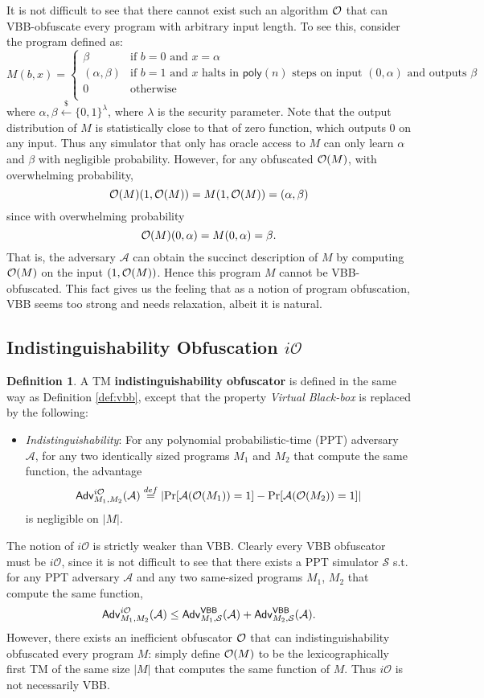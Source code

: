 \documentclass[12pt]{article}
\newcommand{\eqdef}{\stackrel{def}{=}}
\newcommand{\bits}{\{0,1\}}
\newcommand{\getsr}{\stackrel{\$}{\gets}}
\newcommand{\A}{\mathcal{A}}
\newcommand{\Sim}{\mathcal{S}}
\newcommand{\Adv}{\mathsf{Adv}}
\newcommand{\poly}{\mathsf{poly}}
\newcommand{\io}{i\mathcal{O}}
\theoremstyle{definition}
\newtheorem{definition}[theorem]{Definition}
\begin{document}
It is not difficult to see that there cannot exist such an algorithm $\mathcal{O}$ that can VBB-obfuscate every program with arbitrary input length. To see this, consider the program defined as:
$$M(b,x) = 
\begin{cases}
\beta & \textrm{if $b=0$ and $x=\alpha$} \\
(\alpha, \beta) & \textrm{if $b=1$ and $x$ halts in $\poly(n)$ steps on input $(0,\alpha)$ and outputs $\beta$} \\
0 & \textrm{otherwise} \\
\end{cases}$$
where $\alpha, \beta \getsr \bits^\lambda$, where $\lambda$ is the security parameter.
Note that the output distribution of $M$ is statistically close to that of zero function, which outputs 0 on any input. Thus any simulator that only has oracle access to $M$ can only learn $\alpha$ and $\beta$ with negligible probability. However, for any obfuscated $\mathcal{O}(M)$, with overwhelming probability,
$$\mathcal{O}(M)(1, \mathcal{O}(M)) = M(1, \mathcal{O}(M)) = (\alpha, \beta)$$
since with overwhelming probability
$$\mathcal{O}(M)(0,\alpha) = M(0,\alpha) = \beta.$$ 
That is, the adversary $\A$ can obtain the succinct description of $M$ by computing $\mathcal{O}(M)$ on the input $(1, \mathcal{O}(M))$. Hence this program $M$ cannot be VBB-obfuscated. This fact gives us the feeling that as a notion of program obfuscation, VBB seems too strong and needs relaxation, albeit it is natural.

\subsection{Indistinguishability Obfuscation $\io$}
\begin{definition}
A TM {\bf indistinguishability obfuscator} is defined in the same way as Definition \ref{def:vbb}, except that the property \emph{Virtual Black-box} is replaced by the following:
\begin{itemize}
\item \emph{Indistinguishability}: For any polynomial probabilistic-time (PPT) adversary $\A$, for any two identically sized programs $M_1$ and $M_2$ that compute the same function, the advantage 
$$\Adv_{M_1,M_2}^{\io}(\A) \eqdef \left| \Pr[\A(\bigoh(M_1)) = 1] - \Pr[\A(\bigoh(M_2)) = 1] \right|$$
is negligible on $|M|$.
\end{itemize}
\end{definition}

The notion of $\io$ is strictly weaker than VBB. Clearly every VBB obfuscator must be $\io$, since it is not difficult to see that there exists a PPT simulator $\Sim$ s.t. for any PPT adversary $\A$ and any two same-sized programs $M_1$, $M_2$ that compute the same function,
$$\Adv_{M_1,M_2}^{\io}(\A) \leq \Adv_{M_1,\Sim}^{\VBB}(\A) + \Adv_{M_2,\Sim}^{\VBB}(\A).$$
However, there exists an inefficient obfuscator $\mathcal{O}$ that can indistinguishability obfuscated every program $M$: simply define $\mathcal{O}(M)$ to be the lexicographically first TM of the same size $|M|$ that computes the same function of $M$. Thus $\io$ is not necessarily VBB.
\end{document}
